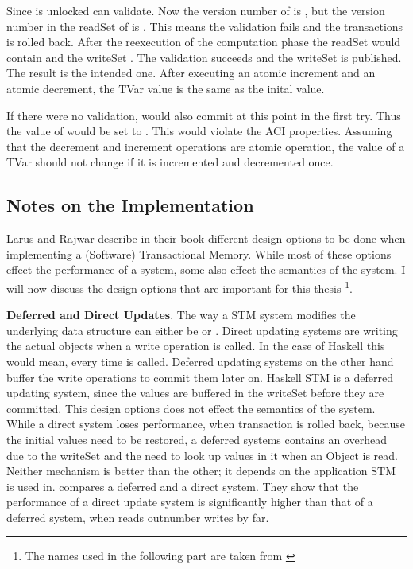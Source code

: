 Since  is unlocked  can validate. Now the version number of  is , but the version
number in the readSet of  is . This means the validation fails and the transactions is rolled back. 
After the reexecution of the computation phase the readSet would contain  and the writeSet . 
The validation succeeds and the writeSet is published. The result is the intended one. After executing an atomic increment
and an atomic decrement, the TVar value is the same as the inital value.

If there were no validation,  would also commit at this point in the first try. Thus the value of  would be set to . 
This would violate the ACI properties. Assuming that the decrement and increment operations are atomic operation, 
the value of a TVar should not change if it is incremented and decremented once.

\subsection{Notes on the Implementation}
Larus and Rajwar describe in their book\parencite[Chapter 2]{transBook} different design options to be done when implementing a 
(Software) Transactional Memory. While most of these options effect the performance of a system, some also effect the 
semantics of the system. I will now discuss the design options that are important for this thesis \footnote{The names used in the 
following part are taken from \parencite[Chapter 2]{transBook}}.

\textbf{Deferred and Direct Updates}. The way a STM system modifies the underlying data structure can either be 
or . Direct updating systems are writing the actual objects when a write operation is called. In the case of Haskell 
this would mean, every time  is called. Deferred updating systems on the other hand buffer the write operations to
commit them later on. Haskell STM is a deferred updating system, since the values are buffered in the writeSet before they are
committed. This design options does not effect the semantics of the system. While a direct system loses performance, when transaction
is rolled back, because the initial values need to be restored, a deferred systems contains an overhead due to the writeSet and the 
need to look up values in it when an Object is read. Neither mechanism is better than the other; it depends on the application STM 
is used in. \parencite{pessimisticSTM} compares a deferred and a direct system. They show that the performance of a direct update 
system is significantly higher than that of a deferred system, when reads outnumber writes by far.

